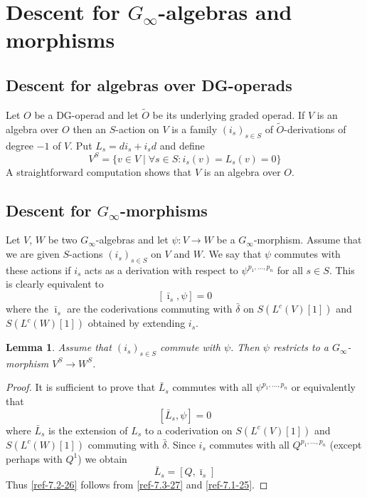 \documentclass{amsart}
\numberwithin{equation}{section}
\newtheorem{lemmas}{Lemma}[subsection]
\theoremstyle{definition}
\theoremstyle{remark}
\begin{document}
\section{Descent for $G_\infty$-algebras and morphisms}
\label{ref-7-23}

\subsection{Descent for algebras over DG-operads}
\label{ref-7.1-24}

Let $O$ be a DG-operad and let $\widetilde{O}$ be its underlying
graded operad.  If $V$ is an algebra over $O$ then an $S$-action on
$V$ is a family $(i_s)_{s\in S}$ of $\widetilde{O}$-derivations of degree
$-1$ of $V$. Put $L_s=di_s+i_sd$
and define
\[
V^S=\{v\in V\mid \forall s\in S:i_s(v)=L_s(v)=0\}
\]
A straightforward computation shows that $V$ is an algebra over $O$. 
\subsection{Descent for $G_\infty$-morphisms}
Let $V$, $W$ be two $G_\infty$-algebras and let $\psi:V\rightarrow W$ be a
$G_\infty$-morphism. 
Assume that we are given $S$-actions
$(i_s)_{s\in S}$ on $V$ and $W$. We say that $\psi$ commutes with these
actions if $i_s$ acts as a derivation with respect to $\psi^{p_1,\ldots,p_n}$
for all $s\in S$. This is clearly equivalent to
\begin{equation}
\label{ref-7.1-25}
[\bar{\imath}_s,\psi]=0
\end{equation}
where the $\bar{\imath}_s$ are the coderivations
commuting with $\bar{\delta}$ on $S(L^c(V)[1])$ and
$S(L^c(W)[1])$ obtained by extending $i_s$. 
\begin{lemmas} Assume that $(i_s)_{s\in S}$ commute with $\psi$. Then $\psi$
restricts to a $G_\infty$-morphism $V^S\rightarrow W^S$. 
\end{lemmas}
\begin{proof} It is sufficient to prove that $\bar{L}_s$ commutes with all
$\psi^{p_1,\ldots,p_n}$ or equivalently that
\begin{equation}
\label{ref-7.2-26}
[\bar{L}_s,\psi]=0
\end{equation}
where $\bar{L}_s$ is the extension of $L_s$ to a coderivation on $S(L^c(V)[1])$
and $S(L^c(W)[1])$ commuting with $\bar{\delta}$. Since $i_s$ commutes
with all $Q^{p_1,\ldots,p_n}$ (except perhaps with $Q^1$) we obtain
\begin{equation}
\label{ref-7.3-27}
\bar{L}_s=[Q,\bar{\imath}_s]
\end{equation}
Thus \eqref{ref-7.2-26} follows from
\eqref{ref-7.3-27} and \eqref{ref-7.1-25}.
\end{proof}
\end{document}
